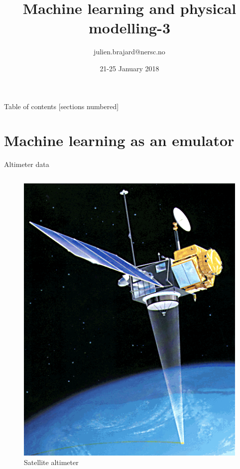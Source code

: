 \documentclass[handout]{beamer}
\title[Machine Learning]{Machine learning and physical modelling-3}
\author[J. Brajard]{julien.brajard@nersc.no}
\institute[NERSC/SU]{NERSC/Sorbonne University\\
\url{https://github.com/brajard/Geilo-Winter-school}}
\date{21-25 January 2018}
\begin{document}
\begin{frame}
\titlepage
\end{frame}

\begin{frame}{Table of contents}
  [sections numbered]
  \tableofcontents[hideallsubsections]
\end{frame}

\section{Machine learning as an emulator}
\begin{frame}{Altimeter data}
\begin{columns}[t]
    \begin{figure}
        \centering
        \caption*{Satellite altimeter}
         \includegraphics[width=.6\textwidth]{fig/L3/TOPEX-Poseidon.png}
    \end{figure}
    


\end{columns}
\end{frame}
\end{document}

